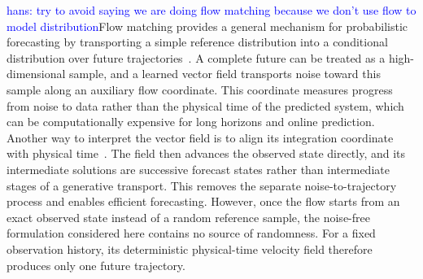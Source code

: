 \documentclass{article} %
\numberwithin{equation}{section}
\newcommand{\hans}[1]{\textcolor{blue}{hans: #1}}
\begin{document}
\hans{try to avoid saying we are doing flow matching because we don't use flow to model distribution}Flow matching provides a general mechanism for probabilistic forecasting by transporting a simple reference distribution into a conditional distribution over future trajectories~\citep{lipman2024flow,kollovieh2025tsflow}. A complete future can be treated as a high-dimensional sample, and a learned vector field transports noise toward this sample along an auxiliary flow coordinate. This coordinate measures progress from noise to data rather than the physical time of the predicted system, which can be computationally expensive for long horizons and online prediction. Another way to interpret the vector field is to align its integration coordinate with physical time~\citep{jiang2025streaming,liu2026odeworld}. The field then advances the observed state directly, and its intermediate solutions are successive forecast states rather than intermediate stages of a generative transport. This removes the separate noise-to-trajectory process and enables efficient forecasting. However, once the flow starts from an exact observed state instead of a random reference sample, the noise-free formulation considered here contains no source of randomness. For a fixed observation history, its deterministic physical-time velocity field therefore produces only one future trajectory.
\end{document}
